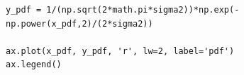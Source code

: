 \begin{exercise}
\begin{solution}
\begin{verbatim}
y_pdf = 1/(np.sqrt(2*math.pi*sigma2))*np.exp(-np.power(x_pdf,2)/(2*sigma2)) 

ax.plot(x_pdf, y_pdf, 'r', lw=2, label='pdf')                                                   
ax.legend()
\end{verbatim} 
 
  
\end{solution}
 \end{exercise}







